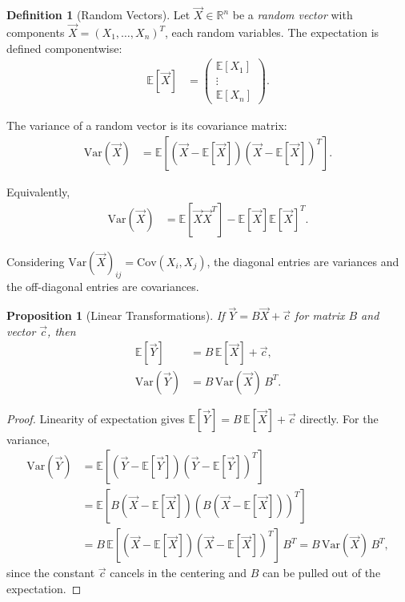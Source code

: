 \documentclass[11pt]{article}
\theoremstyle{definition}
\newtheorem{definition}{Definition}[section]
\theoremstyle{plain}
\newtheorem{proposition}{Proposition}[section]
\theoremstyle{remark}
\begin{document}
\begin{definition}[Random Vectors]

Let $\vec{X} \in \mathbb{R}^n$ be a \textit{random vector} with components $\vec{X} = (X_1,\dots,X_n)^T$, each random variables. The expectation is defined componentwise:
\begin{align}
\mathbb{E}[\vec{X}]
&=
\begin{pmatrix}
\mathbb{E}[X_1] \\
\vdots \\
\mathbb{E}[X_n]
\end{pmatrix}.
\end{align}

The variance of a random vector is its covariance matrix:
\begin{align}
\mathrm{Var}(\vec{X})
&= \mathbb{E}\!\left[(\vec{X}-\mathbb{E}[\vec{X}])(\vec{X}-\mathbb{E}[\vec{X}])^T\right].
\end{align}

Equivalently,
\begin{align}
\mathrm{Var}(\vec{X})
&= \mathbb{E}[\vec{X}\vec{X}^T] - \mathbb{E}[\vec{X}]\mathbb{E}[\vec{X}]^T.
\end{align}

Considering $\mathrm{Var}(\vec{X})_{ij} = \mathrm{Cov}(X_i,X_j)$, the diagonal entries are variances and the off-diagonal entries are covariances.
\end{definition}

\begin{proposition}[Linear Transformations]
If $\vec{Y} = B\vec{X} + \vec{c}$ for matrix $B$ and vector $\vec{c}$, then
\begin{align}
\mathbb{E}[\vec{Y}] &= B\,\mathbb{E}[\vec{X}] + \vec{c}, \\
\mathrm{Var}(\vec{Y}) &= B\,\mathrm{Var}(\vec{X})\,B^T.
\end{align}
\end{proposition}
\begin{proof}
    Linearity of expectation gives $\mathbb{E}[\vec{Y}] = B\,\mathbb{E}[\vec{X}] + \vec{c}$ directly. For the variance,
    \begin{align}
        \mathrm{Var}(\vec{Y}) &= \mathbb{E}[(\vec{Y} - \mathbb{E}[\vec{Y}])(\vec{Y} - \mathbb{E}[\vec{Y}])^T] \\
        &= \mathbb{E}[B(\vec{X} - \mathbb{E}[\vec{X}])(B(\vec{X} - \mathbb{E}[\vec{X}]))^T] \\
        &= B\,\mathbb{E}[(\vec{X} - \mathbb{E}[\vec{X}])(\vec{X} - \mathbb{E}[\vec{X}])^T]\,B^T = B\,\mathrm{Var}(\vec{X})\,B^T,
    \end{align}
    since the constant $\vec{c}$ cancels in the centering and $B$ can be pulled out of the expectation.
\end{proof}
\end{document}

